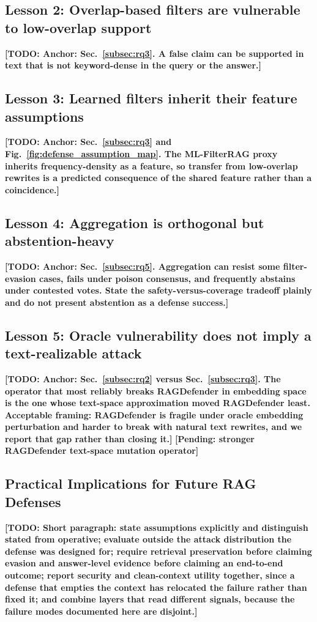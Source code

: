 \documentclass[conference]{IEEEtran}
\newcommand{\PENDING}[1]{\textbf{[Pending: #1]}}
\newcommand{\TODO}[1]{\textbf{[TODO: #1]}}
\begin{document}
\subsection{Lesson 2: Overlap-based filters are vulnerable to low-overlap support}
\TODO{Anchor: Sec.~\ref{subsec:rq3}. A false claim can be supported in text that
is not keyword-dense in the query or the answer.}

\subsection{Lesson 3: Learned filters inherit their feature assumptions}
\TODO{Anchor: Sec.~\ref{subsec:rq3} and Fig.~\ref{fig:defense_assumption_map}. The
ML-FilterRAG proxy inherits frequency-density as a feature, so transfer from
low-overlap rewrites is a predicted consequence of the shared feature rather than
a coincidence.}

\subsection{Lesson 4: Aggregation is orthogonal but abstention-heavy}
\TODO{Anchor: Sec.~\ref{subsec:rq5}. Aggregation can resist some filter-evasion
cases, fails under poison consensus, and frequently abstains under contested
votes. State the safety-versus-coverage tradeoff plainly and do not present
abstention as a defense success.}

\subsection{Lesson 5: Oracle vulnerability does not imply a text-realizable attack}
\TODO{Anchor: Sec.~\ref{subsec:rq2} versus Sec.~\ref{subsec:rq3}. The operator
that most reliably breaks RAGDefender in embedding space is the one whose
text-space approximation moved RAGDefender least. Acceptable framing: RAGDefender
is fragile under oracle embedding perturbation and harder to break with natural
text rewrites, and we report that gap rather than closing it.}
\PENDING{stronger RAGDefender text-space mutation operator}

\subsection{Practical Implications for Future RAG Defenses}
\TODO{Short paragraph: state assumptions explicitly and distinguish stated from
operative; evaluate outside the attack distribution the defense was designed
for; require retrieval preservation before claiming evasion and answer-level
evidence before claiming an end-to-end outcome; report security and clean-context
utility together, since a defense that empties the context has relocated the
failure rather than fixed it; and combine layers that read different signals,
because the failure modes documented here are disjoint.}
\end{document}
